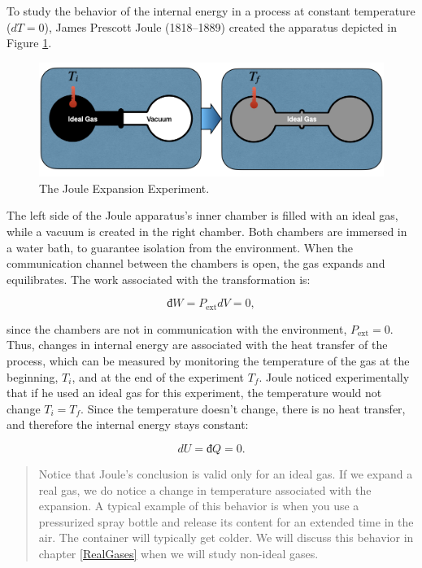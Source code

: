 \documentclass[
]{book}
\theoremstyle{definition}
\theoremstyle{definition}
\theoremstyle{definition}
\theoremstyle{remark}
\begin{document}
To study the behavior of the internal energy in a process at constant temperature (\(dT=0\)), James Prescott Joule (1818--1889) created the apparatus depicted in Figure \ref{fig:FigJexp}.

\begin{figure}

{\centering \includegraphics[width=0.8\linewidth]{./img/OEP_Figures.006} 

}

\caption{The Joule Expansion Experiment.}\label{fig:FigJexp}
\end{figure}

The left side of the Joule apparatus's inner chamber is filled with an ideal gas, while a vacuum is created in the right chamber. Both chambers are immersed in a water bath, to guarantee isolation from the environment. When the communication channel between the chambers is open, the gas expands and equilibrates. The work associated with the transformation is:

\begin{equation}
  đ W=P_{\text{ext}}dV = 0,
  \label{eq:JexpW}
\end{equation}

since the chambers are not in communication with the environment, \(P_{\text{ext}}=0\). Thus, changes in internal energy are associated with the heat transfer of the process, which can be measured by monitoring the temperature of the gas at the beginning, \(T_i\), and at the end of the experiment \(T_f\). Joule noticed experimentally that if he used an ideal gas for this experiment, the temperature would not change \(T_i = T_f\). Since the temperature doesn't change, there is no heat transfer, and therefore the internal energy stays constant:

\begin{equation}
  dU = đ Q = 0.
  \label{eq:JexpQU}
\end{equation}

\begin{quote}
Notice that Joule's conclusion is valid only for an ideal gas. If we expand a real gas, we do notice a change in temperature associated with the expansion. A typical example of this behavior is when you use a pressurized spray bottle and release its content for an extended time in the air. The container will typically get colder. We will discuss this behavior in chapter \ref{RealGases} when we will study non-ideal gases.
\end{quote}
\end{document}
